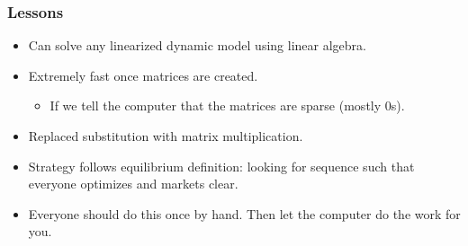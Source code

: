 \documentclass[english,xcolor=svgnames]{beamer}
\begin{document}
	
	\begin{frame}
		\frametitle{Lessons}
			\begin{itemize}
				\item Can solve any linearized dynamic model using linear algebra.
				\item Extremely fast once matrices are created.
				\begin{itemize}
					\item If we tell the computer that the matrices are sparse (mostly 0s).
				\end{itemize}
				\item Replaced substitution with matrix multiplication.
				\item Strategy follows equilibrium definition: looking for sequence such that everyone optimizes and markets clear. 
				\item Everyone should do this once by hand. Then let the computer do the work for you.
			\end{itemize}
	\end{frame}

\end{document}
